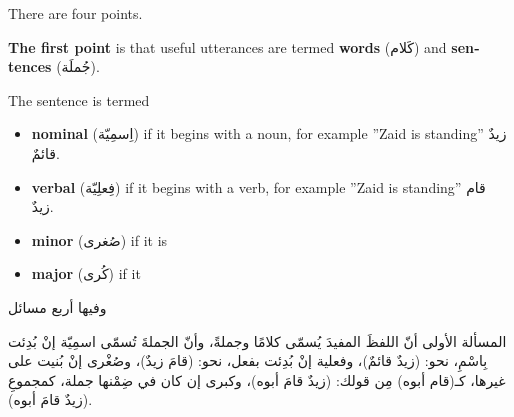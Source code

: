 \documentclass[../main.tex]{subfiles}
\begin{document}
\setlength{\columnsep}{2em}

\begin{paracol}{2}

\begin{english}
    There are four points.

    \textbf{The first point} is that useful utterances are termed \textbf{words} (\textarabic{كَلام}) and \textbf{sentences} (\textarabic{جُملَة}).

    The sentence is termed\footnotemark
    \begin{itemize}
        \item \textbf{nominal} (\textarabic{اِسمِيّة}) if it begins with a noun, for example ''Zaid is standing'' \textarabic{زيدٌ قائمٌ}.\footnotemark
        \item \textbf{verbal} (\textarabic{فِعلِيّة}) if it begins with a verb, for example ''Zaid is standing'' \textarabic{قام زيدٌ}.\footnotemark
        \item \textbf{minor} (\textarabic{صُغرى}) if it is 
        \item \textbf{major} (\textarabic{كُرى}) if it 
    \end{itemize}
    

\end{english}

\switchcolumn
وفيها أربع مسائل

المسألة الأولى أنّ اللفظَ المفيدَ يُسمّى كلامًا وجملةً، وأنّ الجملةَ تُسمّى اسمِيّة إنْ بُدِئت بِاسْمِ، نحو: (زيدٌ قائمٌ)، وفعلية إنْ بُدِئت بفعل، نحو: (قامَ زيدٌ)، وصُغْرى إنْ بُنيت على غيرها، كـ(قام أبوه) مِن قولك: (زيدٌ قامَ أبوه)، وكبرى إن كان في ضِمْنها جملة، كمجموعِ (زيدٌ قامَ أبوه). 

\end{paracol}

\begin{english}
\end{english}
\end{document}
